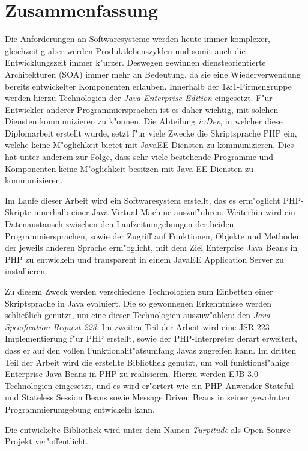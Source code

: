 \cleardoublepage


\chapter{Zusammenfassung}

Die Anforderungen an Softwaresysteme werden heute immer komplexer, gleichzeitig aber
werden Produktlebenszyklen und somit auch die Entwicklungszeit immer k"urzer. Deswegen
gewinnen diensteorientierte Architekturen (SOA) immer mehr an Bedeutung, da sie eine
Wiederverwendung bereits entwickelter Komponenten erlauben. Innerhalb der 1\&1-Firmengruppe
werden hierzu Technologien der \emph{Java Enterprise Edition} eingesetzt. F"ur Entwickler
anderer Programmiersprachen ist es daher wichtig, mit solchen Diensten kommunizieren
zu k"onnen. Die Abteilung \emph{i::Dev}, in welcher diese Diplomarbeit erstellt wurde,
setzt f"ur viele Zwecke die Skriptsprache PHP ein, welche keine M"oglichkeit bietet
mit JavaEE-Diensten zu kommunizieren. Dies hat unter anderem zur Folge, dass
sehr viele bestehende Programme und Komponenten keine M"oglichkeit besitzen mit Java EE-Diensten
zu kommunizieren.

Im Laufe dieser Arbeit wird ein Softwaresystem erstellt, das es erm"oglicht
PHP-Skripte innerhalb einer Java Virtual Machine auszuf"uhren. Weiterhin
wird ein Datenaustausch zwischen den Laufzeitumgebungen der beiden 
Programmiersprachen, sowie der Zugriff auf Funktionen, Objekte und Methoden
der jeweils anderen Sprache erm"oglicht, mit dem Ziel Enterprise Java Beans in
PHP zu entwickeln und transparent in einem JavaEE Application Server zu installieren.

Zu diesem Zweck werden verschiedene Technologien zum Einbetten einer Skriptsprache
in Java evaluiert. Die so gewonnenen Erkenntnisse werden schlie\ss lich 
genutzt, um eine dieser Technologien auszuw"ahlen: den \emph{Java Specification Request 223}.
Im zweiten Teil der Arbeit wird eine JSR 223-Implementierung f"ur PHP erstellt, sowie
der PHP-Interpreter derart erweitert, dass er auf den vollen Funktionalit"atsumfang
Javas zugreifen kann. Im dritten Teil der Arbeit wird die erstellte Bibliothek genutzt,
um voll funktionsf"ahige Enterprise Java Beans in PHP zu realisieren. 
Hierzu werden EJB 3.0 Technologien eingesetzt,
und es wird er"ortert wie ein PHP-Anwender Stateful- und Stateless Session Beans sowie 
Message Driven Beans in seiner gewohnten Programmierumgebung entwickeln kann.

Die entwickelte Bibliothek wird unter dem Namen \emph{Turpitude} als Open Source-Projekt
ver"offentlicht.

